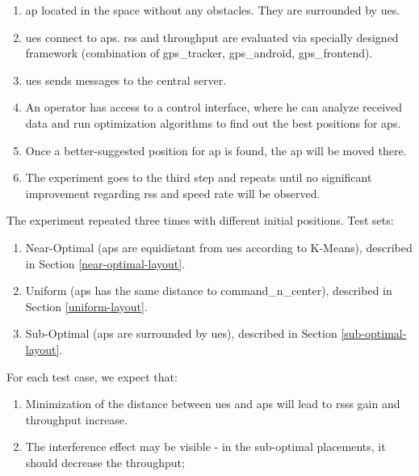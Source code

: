 \begin{enumerate}
	\def\labelenumi{\arabic{enumi}.}
	\tightlist
	\item
	\gls{ap} located in the space without any obstacles. They are surrounded by
	\glspl{ue}.
	\item
	\glspl{ue} connect to \glspl{ap}. \acrshort{rss} and throughput are evaluated via specially designed framework (combination of \gls{gps_tracker}, \gls{gps_android}, \gls{gps_frontend}).
	\item
	\Glspl{ue} sends messages to the central server.
	\item
	An operator has access to a control interface, where he can analyze received data and run optimization algorithms to find out the best positions for \glspl{ap}.
	\item
	Once a better-suggested position for \gls{ap} is found, the \gls{ap} will be moved there.
	\item
	The experiment goes to the third step and repeats until no significant improvement regarding \acrshort{rss} and speed rate will be observed.
\end{enumerate}

The experiment repeated three times with different initial positions. Test sets:

\begin{enumerate}
	\def\labelenumi{\arabic{enumi}.}
	\tightlist
	\item
	Near-Optimal (\glspl{ap} are equidistant from \glspl{ue}  according to K-Means), described in Section \ref{near-optimal-layout}.
	\item
	Uniform (\glspl{ap} has the same distance to \gls{command_n_center}), described in Section \ref{uniform-layout}.  
	\item
	Sub-Optimal (\glspl{ap} are surrounded by \glspl{ue}), described in Section \ref{sub-optimal-layout}.
	
	
\end{enumerate}

For each test case, we expect that:

\begin{enumerate}
	\def\labelenumi{\arabic{enumi}.}
	\tightlist
	\item
	Minimization of the distance between \glspl{ue} and \glspl{ap} will lead to \glspl{rss} gain and throughput increase.
	\item
	The interference effect may be visible - in the sub-optimal
	placements, it should decrease the throughput;
\end{enumerate}